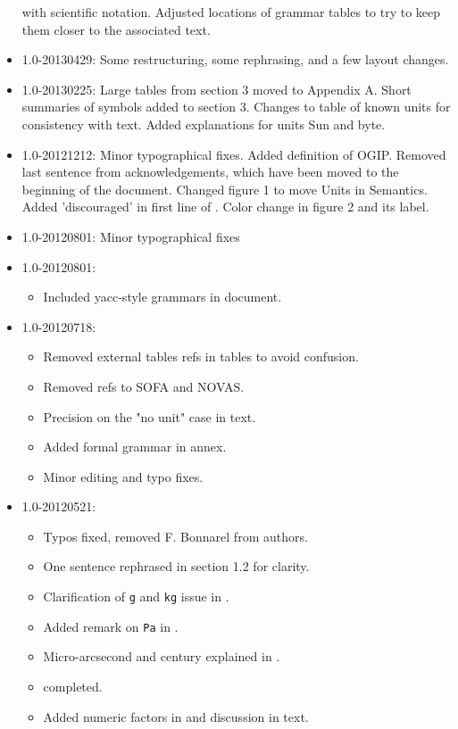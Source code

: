 \documentclass[11pt,notitlepage,onecolumn]{ivoa}
\newcommand{\unit}[1]{\texttt{\small\color{orange}#1}}
\begin{document}
\begin{itemize}
with scientific notation.  Adjusted locations of grammar tables to try
to keep them closer to the associated text.
\item 1.0-20130429: Some restructuring, some rephrasing, and a few layout changes.
\item 1.0-20130225: Large tables from section 3 moved to Appendix A. Short summaries of symbols added
to section 3. Changes to table of known units for consistency with text. Added explanations for units Sun and byte.  
\item 1.0-20121212:
Minor typographical fixes. Added definition of OGIP. Removed last sentence from acknowledgements, which have been moved to the beginning of the document. Changed figure 1 to move Units in Semantics. Added 'discouraged' in first line of . Color change in figure 2 and its label.
\item 1.0-20120801:
Minor typographical fixes
\item 1.0-20120801:
  \begin{itemize}
    \item Included yacc-style grammars in document.
    \end{itemize}
\item 1.0-20120718:
	\begin{itemize}
	\item Removed external tables refs in tables to avoid confusion.
	\item Removed refs to SOFA and NOVAS.
	\item Precision on the "no unit" case in text.
	\item Added formal grammar in annex.
	\item Minor editing and typo fixes.
	\end{itemize}
\item 1.0-20120521:
	\begin{itemize}
	\item Typos fixed, removed F. Bonnarel from authors. 
	\item One sentence rephrased in section 1.2 for clarity.
	\item Clarification of \unit{g} and \unit{kg} issue in .
	\item Added remark on \unit{Pa} in .
	\item Micro-arcsecond and century explained in .
	\item {} completed.
	\item Added numeric factors in  and discussion in text.

\end{itemize}
\end{itemize}
\end{document}
